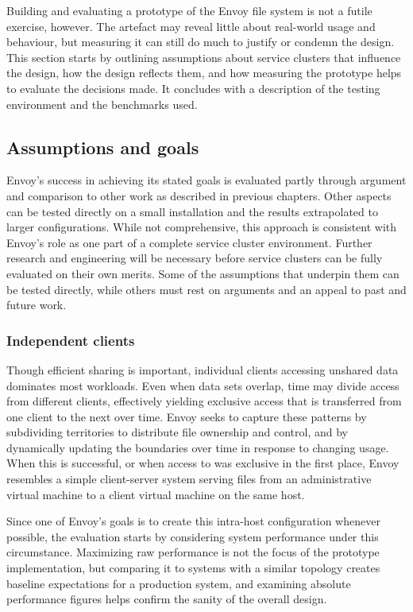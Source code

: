 Building and evaluating a prototype of the Envoy file system is not a futile exercise, however. The artefact may reveal little about real-world usage and behaviour, but measuring it can still do much to justify or condemn the design. This section starts by outlining assumptions about service clusters that influence the design, how the design reflects them, and how measuring the prototype helps to evaluate the decisions made. It concludes with a description of the testing environment and the benchmarks used.

\subsection{Assumptions and goals}

Envoy's success in achieving its stated goals is evaluated partly through argument and comparison to other work as described in previous chapters. Other aspects can be tested directly on a small installation and the results extrapolated to larger configurations. While not comprehensive, this approach is consistent with Envoy's role as one part of a complete service cluster environment. Further research and engineering will be necessary before service clusters can be fully evaluated on their own merits. Some of the assumptions that underpin them can be tested directly, while others must rest on arguments and an appeal to past and future work.

\subsubsection{Independent clients}

Though efficient sharing is important, individual clients accessing unshared data dominates most workloads. Even when data sets overlap, time may divide access from different clients, effectively yielding exclusive access that is transferred from one client to the next over time. Envoy seeks to capture these patterns by subdividing territories to distribute file ownership and control, and by dynamically updating the boundaries over time in response to changing usage. When this is successful, or when access to was exclusive in the first place, Envoy resembles a simple client-server system serving files from an administrative virtual machine to a client virtual machine on the same host.

Since one of Envoy's goals is to create this intra-host configuration whenever possible, the evaluation starts by considering system performance under this circumstance. Maximizing raw performance is not the focus of the prototype implementation, but comparing it to systems with a similar topology creates baseline expectations for a production system, and examining absolute performance figures helps confirm the sanity of the overall design.

